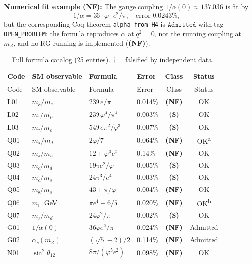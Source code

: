 \documentclass[12pt,a4paper]{article}
\newcommand{\Admitted}{\texttt{Admitted}}
\newcommand{\Sclass}{\textbf{(S)}}
\newcommand{\NFclass}{\textbf{(NF)}}
\begin{document}
\textbf{Numerical fit example (NF):}
The gauge coupling \(1/\alpha(0) \approx 137.036\) is fit by
\begin{equation}
  1/\alpha = 36 \cdot \varphi \cdot e^2 / \pi,
  \quad \text{error } 0.0243\%,
  \label{eq:G01}
\end{equation}
but the corresponding Coq theorem \texttt{alpha\_from\_H4} is \(\Admitted\) with tag
\texttt{OPEN\_PROBLEM}: the formula reproduces \(\alpha\) at \(q^2=0\), not the
running coupling at \(m_Z\), and no RG-running is implemented (\NFclass).

\begin{longtable}{llllcc}
  \caption{Full formula catalog (25 entries). $\dagger$ = falsified by independent data.}
  \label{tab:formulas}\\
  \toprule
  Code & SM observable & Formula & Error & Class & Status \\
  \midrule
  \endfirsthead
  \toprule
  Code & SM observable & Formula & Error & Class & Status \\
  \midrule
  \endhead
  \bottomrule
  \endfoot
  L01 & \(m_\mu/m_e\) & \(239\,e/\pi\) & 0.014\% & \NFclass & OK \\
  L02 & \(m_\tau/m_\mu\) & \(239\,\varphi^4/\pi^4\) & 0.003\% & \Sclass & OK \\
  L03 & \(m_\tau/m_e\) & \(549\,e\pi^2/\varphi^3\) & 0.007\% & \Sclass & OK \\
  Q01 & \(m_u/m_d\) & \(2\varphi/7\) & 0.064\% & \NFclass & OK\textsuperscript{a} \\
  Q02 & \(m_s/m_u\) & \(12+\varphi^3 e^2\) & 0.14\% & \NFclass & OK \\
  Q03 & \(m_c/m_d\) & \(19\pi e^2/\varphi\) & 0.005\% & \Sclass & OK \\
  Q04 & \(m_c/m_s\) & \(24\pi^3/e^4\) & 0.003\% & \Sclass & OK \\
  Q05 & \(m_b/m_s\) & \(43+\pi/\varphi\) & 0.004\% & \NFclass & OK \\
  Q06 & \(m_t\) [GeV] & \(\pi e^4 + 6/5\) & 0.020\% & \NFclass & OK\textsuperscript{b} \\
  Q07 & \(m_s/m_d\) & \(24\varphi^2/\pi\) & 0.002\% & \Sclass & OK \\
  G01 & \(1/\alpha(0)\) & \(36\varphi e^2/\pi\) & 0.024\% & \NFclass & Admitted \\
  G02 & \(\alpha_s(m_Z)\) & \((\sqrt5-2)/2\) & 0.114\% & \NFclass & Admitted \\
  N01 & \(\sin^2\theta_{12}\) & \(8\pi/(\varphi^5 e^2)\) & 0.098\% & \NFclass & OK \\

\end{longtable}
\end{document}
